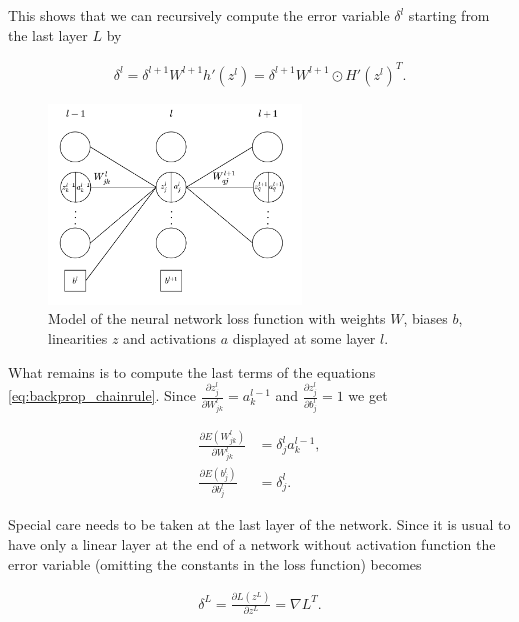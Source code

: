 \documentclass[english,11pt,a4paper]{article}
\begin{document}
This shows that we can recursively compute the error variable $\delta^l$ starting from the last layer $L$ by

\begin{equation}
	\begin{aligned}
		\delta^l = \delta^{l+1}W^{l+1} h'(z^l) = \delta^{l+1}W^{l+1} \odot H'(z^l)^T.
	\end{aligned}
\end{equation}

\begin{figure}[t]
	\centering
	\includegraphics[width=0.6\textwidth]{images/backprop}
	\caption{Model of the neural network loss function with weights $W$, biases $b$, linearities $z$ and activations $a$ displayed at some layer $l$.}
	\label{fig:backprop}
\end{figure}

What remains is to compute the last terms of the equations \ref{eq:backprop_chainrule}. Since $\frac{\partial z^l_j}{\partial W^l_{jk}} = a^{l-1}_k$ and $\frac{\partial z^l_j}{\partial b_j^l} = 1$ we get

\begin{equation}
	\begin{aligned}
		\frac{\partial E(W_{jk}^l)}{\partial W_{jk}^l} &= \delta^l_j a^{l-1}_k, \\
		\frac{\partial E(b_j^l)}{\partial b_j^l} &= \delta^l_j.
	\end{aligned}
\end{equation}

Special care needs to be taken at the last layer of the network. Since it is usual to have only a linear layer at the end of a network without activation function the error variable (omitting the constants in the loss function) becomes 

\begin{equation}
	\begin{aligned}
		\delta^L = \frac{\partial L(z^L)}{\partial z^L} = \nabla L^T.
	\end{aligned}
\end{equation}
\end{document}
